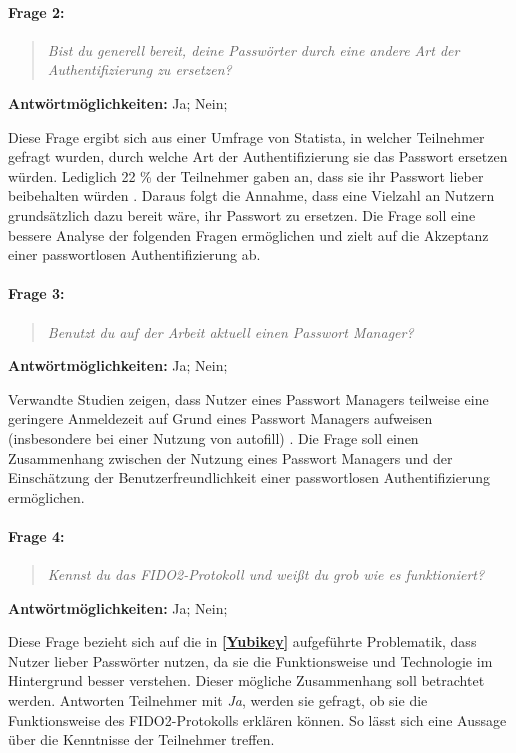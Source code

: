 \paragraph{Frage 2:}

\begin{quote}
    \textit{Bist du generell bereit, deine Passwörter durch eine andere Art der Authentifizierung zu ersetzen?}
\end{quote}
\textbf{Antwörtmöglichkeiten:} Ja; Nein; 

Diese Frage ergibt sich aus einer Umfrage von Statista, in welcher Teilnehmer gefragt wurden, durch welche Art der Authentifizierung sie das Passwort ersetzen würden. Lediglich 22 \% der Teilnehmer gaben an, dass sie ihr Passwort lieber beibehalten würden \cite{techstat}. Daraus folgt die Annahme, dass eine Vielzahl an Nutzern grundsätzlich dazu bereit wäre, ihr Passwort zu ersetzen. Die Frage soll eine bessere Analyse der folgenden Fragen ermöglichen und zielt auf die Akzeptanz einer passwortlosen Authentifizierung ab.

\paragraph{Frage 3:}

\begin{quote}
    \textit{Benutzt du auf der Arbeit aktuell einen Passwort Manager?}
\end{quote}

\textbf{Antwörtmöglichkeiten:} Ja; Nein;

Verwandte Studien zeigen, dass Nutzer eines Passwort Managers teilweise eine geringere Anmeldezeit auf Grund eines Passwort Managers aufweisen (insbesondere bei einer Nutzung von autofill) \cite{farke2020you}. Die Frage soll einen Zusammenhang zwischen der Nutzung eines Passwort Managers und der Einschätzung der Benutzerfreundlichkeit einer passwortlosen Authentifizierung ermöglichen.

\paragraph{Frage 4:}

\begin{quote}
    \textit{Kennst du das FIDO2-Protokoll und weißt du grob wie es funktioniert?}
\end{quote}

\textbf{Antwörtmöglichkeiten:} Ja; Nein;

Diese Frage bezieht sich auf die in \textbf{\ref{Yubikey}} aufgeführte Problematik, dass Nutzer lieber Passwörter nutzen, da sie die Funktionsweise und Technologie im Hintergrund besser verstehen. Dieser mögliche Zusammenhang soll betrachtet werden. Antworten Teilnehmer mit \textit{Ja}, werden sie gefragt, ob sie die Funktionsweise des FIDO2-Protokolls erklären können. So lässt sich eine Aussage über die Kenntnisse der Teilnehmer treffen. 

